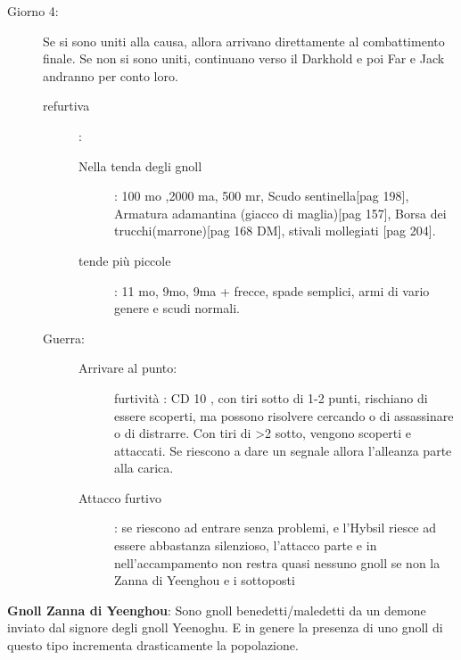 \documentclass{article}
\begin{document}
\begin{description}
    \item[Giorno 4:] Se si sono uniti alla causa, allora arrivano direttamente al combattimento finale. Se non si sono uniti, continuano verso il Darkhold e poi Far e Jack andranno per conto loro.
        \begin{description}
            \item[refurtiva]: 
                \begin{description}
                    \item[Nella tenda degli gnoll] : 100 mo ,2000 ma, 500 mr, Scudo sentinella[pag  198], Armatura adamantina (giacco di maglia)[pag 157], Borsa dei trucchi(marrone)[pag 168 DM], stivali mollegiati [pag 204]. 
                    \item[tende più piccole]: 11 mo, 9mo, 9ma + frecce, spade semplici, armi di vario genere e scudi normali. 
                \end{description}
            \item[Guerra:]
                \begin{description}
                    \item[Arrivare al punto:] furtività : CD 10 , con tiri sotto di 1-2 punti, rischiano di essere scoperti, ma possono risolvere cercando o di assassinare o di distrarre. Con tiri di >2 sotto, vengono scoperti e attaccati. Se riescono a dare un segnale allora l'alleanza parte alla carica.
                    \item[Attacco furtivo]: se riescono ad entrare senza problemi, e l'Hybsil riesce ad essere abbastanza silenzioso, l'attacco parte e in nell'accampamento non restra quasi nessuno gnoll se non la Zanna di Yeenghou e i sottoposti   
                \end{description}
        \end{description}
\end{description}

\textbf{Gnoll Zanna di Yeenghou}: Sono gnoll benedetti/maledetti da un demone inviato dal signore degli gnoll Yeenoghu. E in genere la presenza di uno gnoll di questo tipo incrementa drasticamente la popolazione. 
\end{document}
